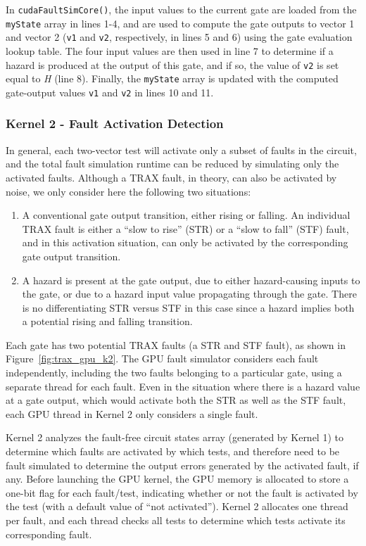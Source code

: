 In \verb+cudaFaultSimCore()+, the input values to the current gate are loaded from the \verb+myState+ array in lines 1-4, and are used to compute the gate outputs to vector 1 and vector 2 (\verb+v1+ and \verb+v2+, respectively, in lines 5 and 6) using the gate evaluation lookup table.
%
The four input values are then used in line 7 to determine if a hazard is produced at the output of this gate, and if so, the value of \verb+v2+ is set equal to \textit{H} (line 8).
%
Finally, the \verb+myState+ array is updated with the computed gate-output values \verb+v1+ and \verb+v2+ in lines 10 and 11.

\subsubsection{Kernel 2 - Fault Activation Detection}
\label{sec:trax_gpu_k2}

In general, each two-vector test will activate only a subset of faults in the circuit, and the total fault simulation runtime can be reduced by simulating only the activated faults.
%
Although a TRAX fault, in theory, can also be activated by noise, we only consider here the following two situations:
\begin{enumerate}
\item A conventional gate output transition, either rising or falling.
%
An individual TRAX fault is either a ``slow to rise'' (STR) or a ``slow to fall'' (STF) fault, and in this activation situation, can only be activated by the corresponding gate output transition.
%
\item A hazard is present at the gate output, due to either hazard-causing inputs to the gate, or due to a hazard input value propagating through the gate.
%
There is no differentiating STR versus STF in this case since a hazard implies both a potential rising and falling transition.
\end{enumerate}

Each gate has two potential TRAX faults (a STR and STF fault), as shown in Figure~\ref{fig:trax_gpu_k2}.
%
The GPU fault simulator considers each fault independently, including the two faults belonging to a particular gate, using a separate thread for each fault.
%
Even in the situation where there is a hazard value at a gate output, which would activate both the STR as well as the STF fault, each GPU thread in Kernel 2 only considers a single fault.

Kernel 2 analyzes the fault-free circuit states array (generated by Kernel 1) to determine which faults are activated by which tests, and therefore need to be fault simulated to determine the output errors generated by the activated fault, if any.
%
Before launching the GPU kernel, the GPU memory is allocated to store a one-bit flag for each fault/test, indicating whether or not the fault is activated by the test (with a default value of ``not activated'').
%
Kernel 2 allocates one thread per fault, and each thread checks all tests to determine which tests activate its corresponding fault.

